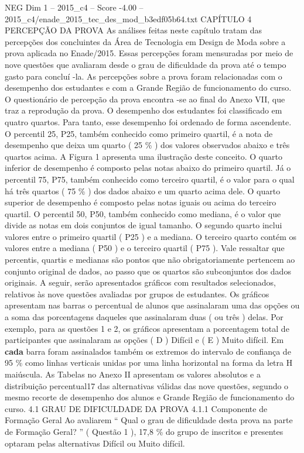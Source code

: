 \begin{textsample}{NEG Dim 1 – 2015\_c4 – Score -4.00 – 2015\_c4/enade\_2015\_tec\_des\_mod\_b3edf05b64.txt}  \label{ex:f1_neg_110}
CAPÍTULO 4 PERCEPÇÃO DA PROVA As análises feitas neste capítulo tratam das percepções dos concluintes da Área de Tecnologia em Design de Moda sobre a prova aplicada no Enade/2015.
Essas percepções foram mensuradas por meio de nove questões que avaliaram desde o grau de dificuldade da prova até o tempo gasto para concluí -la.
As percepções sobre a prova foram relacionadas com o desempenho dos estudantes e com a Grande Região de funcionamento do curso.
O questionário de percepção da prova encontra -se ao final do Anexo VII, que traz a reprodução da prova.
O desempenho dos estudantes foi classificado em quatro quartos.
Para tanto, esse desempenho foi ordenado de forma ascendente.
O percentil 25, P25, também conhecido como primeiro quartil, é a nota de desempenho que deixa um quarto ( 25 \% ) dos valores observados abaixo e três quartos acima.
A Figura 1 apresenta uma ilustração deste conceito.
O quarto inferior de desempenho é composto pelas notas abaixo do primeiro quartil.
Já o percentil 75, P75, também conhecido como terceiro quartil, é o valor para o qual há três quartos ( 75 \% ) dos dados abaixo e um quarto acima dele.
O quarto superior de desempenho é composto pelas notas iguais ou acima do terceiro quartil.
O percentil 50, P50, também conhecido como mediana, é o valor que divide as notas em dois conjuntos de igual tamanho.
O segundo quarto inclui valores entre o primeiro quartil ( P25 ) e a mediana.
O terceiro quarto contém os valores entre a mediana ( P50 ) e o terceiro quartil ( P75 ).
Vale ressaltar que percentis, quartis e medianas são pontos que não obrigatoriamente pertencem ao conjunto original de dados, ao passo que os quartos são subconjuntos dos dados originais.
A seguir, serão apresentados gráficos com resultados selecionados, relativos às nove questões avaliadas por grupos de estudantes.
Os gráficos apresentam nas barras o percentual de alunos que assinalaram uma das opções ou a soma das porcentagens daqueles que assinalaram duas ( ou três ) delas.
Por exemplo, para as questões 1 e 2, os gráficos apresentam a porcentagem total de participantes que assinalaram as opções ( D ) Difícil e ( E ) Muito difícil.
Em \textbf{cada} barra foram assinalados também os extremos do intervalo de confiança de 95 \% como linhas verticais unidas por uma linha horizontal na forma da letra H maiúscula.
As Tabelas no Anexo II apresentam os valores absolutos e a distribuição percentual17 das alternativas válidas das nove questões, segundo o mesmo recorte de desempenho dos alunos e Grande Região de funcionamento do curso. 4.1 GRAU DE DIFICULDADE DA PROVA 4.1.1 Componente de Formação Geral Ao avaliarem “ Qual o grau de dificuldade desta prova na parte de Formação Geral? ” ( Questão 1 ), 17,8 \% do grupo de inscritos e presentes optaram pelas alternativas Difícil ou Muito difícil.

\end{textsample}
